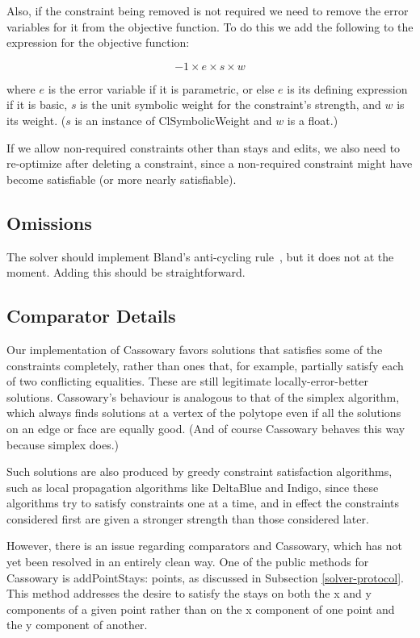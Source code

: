 \documentclass{article}
\begin{document}
Also, if the constraint being removed is not required we need to remove the
error variables for it from the objective function.  To do this we add the
following to the expression for the objective function:

$$ -1 \times e \times s \times w $$

where $e$ is the error variable if it is parametric, or else $e$ is its
defining expression if it is basic, $s$ is the unit symbolic weight for the
constraint's strength, and $w$ is its weight.  ($s$ is an instance of 
{\sf ClSymbolicWeight} and $w$ is a float.)

If we allow non-required constraints other than stays and edits, we also
need to re-optimize after deleting a constraint, since a non-required
constraint might have become satisfiable (or more nearly satisfiable).

\subsection{Omissions}

The solver should implement Bland's anti-cycling
rule~\cite{marriott-stuckey-book}, but it does not at the moment.
Adding this should be straightforward.

\subsection{Comparator Details}  
\label{comparator-details}  

Our implementation of Cassowary favors solutions that satisfies some of the
constraints completely, rather than ones that, for example, partially satisfy each
of two conflicting equalities.  These are still legitimate
locally-error-better solutions.  Cassowary's behaviour is analogous to that
of the simplex algorithm, which always finds solutions at a vertex of the
polytope even if all the solutions on an edge or face are equally good.
(And of course Cassowary behaves this way because simplex does.)

Such solutions are also produced by greedy constraint satisfaction
algorithms, such as local propagation algorithms like DeltaBlue and Indigo,
since these algorithms try to satisfy constraints one at a time, and in
effect the constraints considered first are given a stronger strength than
those considered later.

However, there is an issue regarding comparators and Cassowary, which has
not yet been resolved in an entirely clean way.  One of the public methods
for Cassowary is {\sf addPointStays: points}, as discussed in Subsection
\ref{solver-protocol}.  This method addresses the desire to satisfy the
stays on both the {\sf x} and {\sf y} components of a given point rather
than on the {\sf x} component of one point and the {\sf y} component of
another.
\end{document}
